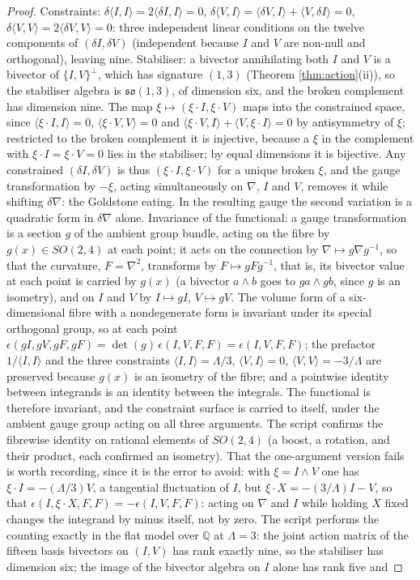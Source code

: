 \documentclass[11pt]{article}
\theoremstyle{definition}
\newcommand{\ip}[2]{\langle #1, #2\rangle}
\begin{document}
\begin{proof}
Constraints: $\delta\ip{I}{I} = 2\ip{\delta I}{I} = 0$, $\delta\ip{V}{I} = \ip{\delta V}{I} + \ip{V}{\delta I} = 0$, $\delta\ip{V}{V} = 2\ip{\delta V}{V} = 0$: three independent linear conditions on the twelve components of $(\delta I, \delta V)$ (independent because $I$ and $V$ are non-null and orthogonal), leaving nine. Stabiliser: a bivector annihilating both $I$ and $V$ is a bivector of $\{I,V\}^\perp$, which has signature $(1,3)$ (Theorem \ref{thm:action}(ii)), so the stabiliser algebra is $\mathfrak{so}(1,3)$, of dimension six, and the broken complement has dimension nine. The map $\xi \mapsto (\xi\cdot I, \xi\cdot V)$ maps into the constrained space, since $\ip{\xi\cdot I}{I} = 0$, $\ip{\xi\cdot V}{V} = 0$ and $\ip{\xi\cdot V}{I} + \ip{V}{\xi\cdot I} = 0$ by antisymmetry of $\xi$; restricted to the broken complement it is injective, because a $\xi$ in the complement with $\xi\cdot I = \xi\cdot V = 0$ lies in the stabiliser; by equal dimensions it is bijective. Any constrained $(\delta I, \delta V)$ is thus $(\xi\cdot I, \xi\cdot V)$ for a unique broken $\xi$, and the gauge transformation by $-\xi$, acting simultaneously on $\nabla$, $I$ and $V$, removes it while shifting $\delta\nabla$: the Goldstone eating. In the resulting gauge the second variation is a quadratic form in $\delta\nabla$ alone. Invariance of the functional: a gauge transformation is a section $g$ of the ambient group bundle, acting on the fibre by $g(x) \in SO(2,4)$ at each point; it acts on the connection by $\nabla \mapsto g\nabla g^{-1}$, so that the curvature, $F = \nabla^2$, transforms by $F \mapsto gFg^{-1}$, that is, its bivector value at each point is carried by $g(x)$ (a bivector $a\wedge b$ goes to $ga\wedge gb$, since $g$ is an isometry), and on $I$ and $V$ by $I \mapsto gI$, $V \mapsto gV$. The volume form of a six-dimensional fibre with a nondegenerate form is invariant under its special orthogonal group, so at each point $\epsilon(gI, gV, gF, gF) = \det(g)\,\epsilon(I, V, F, F) = \epsilon(I, V, F, F)$; the prefactor $1/\ip{I}{I}$ and the three constraints $\ip{I}{I} = \Lambda/3$, $\ip{V}{I} = 0$, $\ip{V}{V} = -3/\Lambda$ are preserved because $g(x)$ is an isometry of the fibre; and a pointwise identity between integrands is an identity between the integrals. The functional is therefore invariant, and the constraint surface is carried to itself, under the ambient gauge group acting on all three arguments. The script confirms the fibrewise identity on rational elements of $SO(2,4)$ (a boost, a rotation, and their product, each confirmed an isometry). That the one-argument version fails is worth recording, since it is the error to avoid: with $\xi = I\wedge V$ one has $\xi\cdot I = -(\Lambda/3)V$, a tangential fluctuation of $I$, but $\xi\cdot X = -(3/\Lambda)I - V$, so that $\epsilon(I, \xi\cdot X, F, F) = -\epsilon(I, V, F, F)$: acting on $\nabla$ and $I$ while holding $X$ fixed changes the integrand by minus itself, not by zero. The script performs the counting exactly in the flat model over $\mathbb{Q}$ at $\Lambda = 3$: the joint action matrix of the fifteen basis bivectors on $(I, V)$ has rank exactly nine, so the stabiliser has dimension six; the image of the bivector algebra on $I$ alone has rank five and 
\end{proof}
\end{document}
